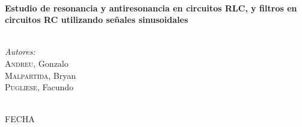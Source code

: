 \begin{titlepage}
\HRule \\[0.4cm]
{ \huge \bfseries Estudio de resonancia y antiresonancia en circuitos RLC, y filtros en circuitos RC utilizando señales sinusoidales }\\[0.2cm] %
\HRule \\[1cm]
 

\begin{minipage}{0.4\textwidth}
\begin{center} \large
\emph{Autores:}\\
\textsc{Andreu}, Gonzalo\\ %
\textsc{Malpartida}, Bryan\\ %
\textsc{Pugliese}, Facundo\\ %


\end{center}
\end{minipage}
~ \\[1.25cm]





{\large FECHA}\\[1.75cm] %



\end{titlepage}
